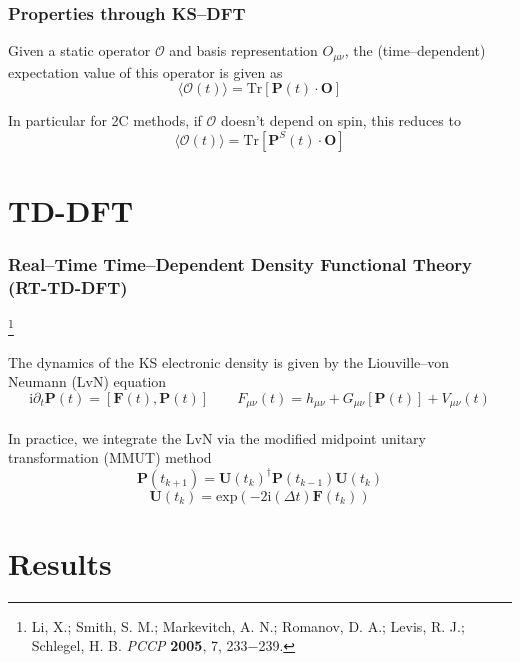 \documentclass{beamer}
\newcommand{\bpar}[1]{\left( #1 \right)}                  %
\newcommand{\comm}[2]{\left[ #1 , #2\right]}
\renewcommand{\exp}[1]{\mathrm{exp}\bpar{#1}}
\newcommand\blfootnote[1]{%
  \begingroup
  \renewcommand\thefootnote{}\footnote{#1}%
  \addtocounter{footnote}{-1}%
  \endgroup
}
\begin{document}
\begin{frame}
\frametitle{Properties through KS--DFT}

Given a static operator $\mathcal{O}$ and basis representation $O_{\mu\nu}$, the (time--dependent) expectation value
of this operator is given as
\begin{equation*}
\langle \mathcal{O}(t) \rangle = \mathrm{Tr}[\mathbf{P}(t)\cdot\mathbf{O}]
\end{equation*}

In particular for 2C methods, if $\mathcal{O}$ doesn't depend on spin, this reduces to
\begin{equation*}
\langle \mathcal{O}(t) \rangle = \mathrm{Tr}[\mathbf{P}^S(t)\cdot\mathbf{O}]
\end{equation*}

\end{frame}

\section{TD-DFT}

\begin{frame}
\frametitle{Real--Time Time--Dependent Density Functional Theory (RT-TD-DFT)}
\blfootnote{Li, X.; Smith, S. M.; Markevitch, A. N.; Romanov, D. A.; Levis, R.
J.; Schlegel, H. B. \emph{PCCP} \textbf{2005}, 7, 233−239.}

The dynamics of the KS electronic density is given by the Liouville--von Neumann (LvN) equation
\begin{equation*}
  \mathrm{i}\partial_t\mathbf{P}(t) = \comm{\mathbf{F}(t)}{\mathbf{P}(t)} \qquad F_{\mu\nu}(t) = h_{\mu\nu} + G_{\mu\nu}[\mathbf{P}(t)] + V_{\mu\nu}(t)
\end{equation*}
~\\

In practice, we integrate the LvN via the modified midpoint unitary transformation (MMUT)
method
\begin{equation*}
\mathbf{P}(t_{k+1}) = \mathbf{U}(t_k)^\dagger \mathbf{P}(t_{k-1}) \mathbf{U}(t_k)
\end{equation*}
\begin{equation*}
\mathbf{U}(t_k) = \exp{-2\mathrm{i}(\Delta t) \mathbf{F}(t_k)}
\end{equation*}

\end{frame}

\section{Results}
\end{document}
